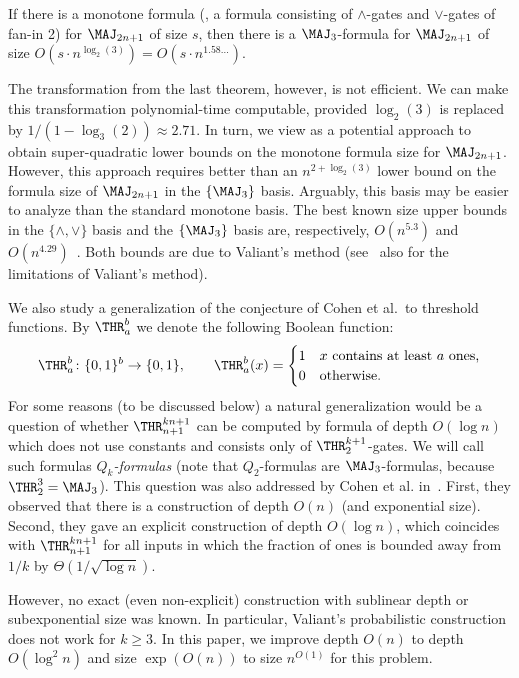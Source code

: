\begin{theorem}
\label{transformation}
If there is a monotone formula (\ie, a formula consisting of $\land$-gates and $\lor$-gates of fan-in 2) for $\MAJ_{2n + 1}$ of size $s$, then there is a $\MAJ_3$-formula for $\MAJ_{2n + 1}$ of size $O(s \cdot n^{\log_2(3)}) = O(s \cdot n^{1.58\ldots})$.
\end{theorem}
The transformation from the last theorem, however, is not efficient. We can make this transformation polynomial-time computable, provided $\log_2(3)$ is replaced by $1/(1 - \log_3(2)) \approx 2.71$.  In turn, we view 
as a potential approach to obtain super-quadratic lower bounds on the monotone formula size for $\MAJ_{2n + 1}$. However, this approach requires better than an $n^{2 +\log_2(3)}$ lower bound on the formula size of $\MAJ_{2n + 1}$ in the $\{\MAJ_3\}$ basis. Arguably, this basis may be easier to analyze than the standard monotone basis. The best known size upper bounds  in the $\{\land, \lor\}$ basis and the $\{\MAJ_3\}$ basis are, respectively, $O(n^{5.3})$ and $O(n^{4.29})$~\cite{GM96}. Both bounds are due to Valiant's method (see~\cite{GM96} also for the limitations of Valiant's method). 

We also study a generalization of the conjecture of Cohen et al.~to threshold functions. By $\THR^b_a$ we denote the following Boolean function:
\[\THR^b_a\colon\{0, 1\}^b \to \{0, 1\}, \qquad \THR^b_a(x) = \begin{cases} 1 & \mbox{$x$ contains at least $a$ ones,} \\ 0 &\mbox{otherwise.} \end{cases}\]
For some reasons (to be discussed below) a natural generalization would be a question of whether $\THR^{kn + 1}_{n + 1}$ can be computed by 
%
formula of depth $O(\log n)$  %
which does not use constants and consists only of $\THR^{k+1}_2$-gates. We will call such formulas \emph{$Q_k$-formulas} (note that $Q_2$-formulas are $\MAJ_3$-formulas, because $\THR^{3}_2 = \MAJ_3$). This question was also addressed by Cohen et al. in~\cite{Cohen2013}. First, they observed that there is a construction of depth $O(n)$ (and exponential size).
%
Second,  %
they gave an explicit construction of depth $O(\log n)$, which coincides with $\THR^{kn + 1}_{n + 1}$ for all inputs in which the fraction of ones is bounded away from $1/k$ by $\Theta(1/\sqrt{\log n})$.



However, no exact (even non-explicit) construction with sublinear depth or
subexponential size was known. In particular, Valiant's probabilistic construction does not work for $k\ge 3$.
%
%
%
In this paper, we improve
%
depth $O(n)$ to depth $O(\log^2 n)$ and   %
%
size $\exp\left(O(n)\right)$ to size $n^{O(1)}$
for this problem.

